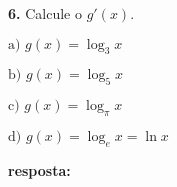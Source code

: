 \documentclass[article,12pt,oneside,a4paper,brazil]{abntex2}
\begin{document}
\begin{flushleft}
		\vspace{1em}
		
		\textbf{6.} Calcule o $g'(x)$.
		
		\begin{adjustwidth}{0.5cm}{0cm}
			$\text{a) } g(x) = \log_{3}{x}$
			
			$\text{b) } g(x) = \log_{5}{x}$
			
			$\text{c) } g(x) = \log_{\pi}{x}$
			
			$\text{d) } g(x) = \log_{e}{x} = \ln{x}$
		\end{adjustwidth}	
		
		\textbf{resposta:}
		
		
		\vspace{1em}
	\end{flushleft}
	

	
	
\end{document}
